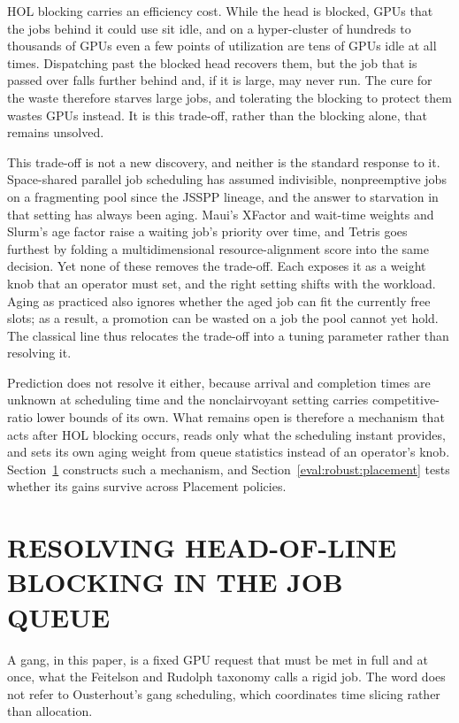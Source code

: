 \documentclass{ieeetj}
\begin{document}
HOL blocking carries an efficiency cost. While the head is blocked, GPUs that the jobs behind it could use sit idle, and on a hyper-cluster of hundreds to thousands of GPUs even a few points of utilization are tens of GPUs idle at all times. Dispatching past the blocked head recovers them, but the job that is passed over falls further behind and, if it is large, may never run. The cure for the waste therefore starves large jobs, and tolerating the blocking to protect them wastes GPUs instead. It is this trade-off, rather than the blocking alone, that remains unsolved.

This trade-off is not a new discovery, and neither is the standard response to it. Space-shared parallel job scheduling has assumed indivisible, nonpreemptive jobs on a fragmenting pool since the JSSPP lineage\cite{feitelson1996toward}, and the answer to starvation in that setting has always been aging. Maui's XFactor and wait-time weights\cite{jackson2001maui} and Slurm's age factor raise a waiting job's priority over time, and Tetris\cite{grandl2014multi} goes furthest by folding a multidimensional resource-alignment score into the same decision. Yet none of these removes the trade-off. Each exposes it as a weight knob that an operator must set, and the right setting shifts with the workload. Aging as practiced also ignores whether the aged job can fit the currently free slots; as a result, a promotion can be wasted on a job the pool cannot yet hold. The classical line thus relocates the trade-off into a tuning parameter rather than resolving it.

Prediction does not resolve it either, because arrival and completion times are unknown at scheduling time and the nonclairvoyant setting carries competitive-ratio lower bounds of its own\cite{motwani1994nonclairvoyant}. What remains open is therefore a mechanism that acts after HOL blocking occurs, reads only what the scheduling instant provides, and sets its own aging weight from queue statistics instead of an operator's knob. Section~\ref{algo:intro} constructs such a mechanism, and Section~\ref{eval:robust:placement} tests whether its gains survive across Placement policies.

\section{RESOLVING HEAD-OF-LINE BLOCKING IN THE JOB QUEUE}\label{algo:intro}
A gang, in this paper, is a fixed GPU request that must be met in full and at once, what the Feitelson and Rudolph taxonomy\cite{feitelson1996toward} calls a rigid job. The word does not refer to Ousterhout's gang scheduling\cite{ousterhout1982gang}, which coordinates time slicing rather than allocation.
\end{document}
